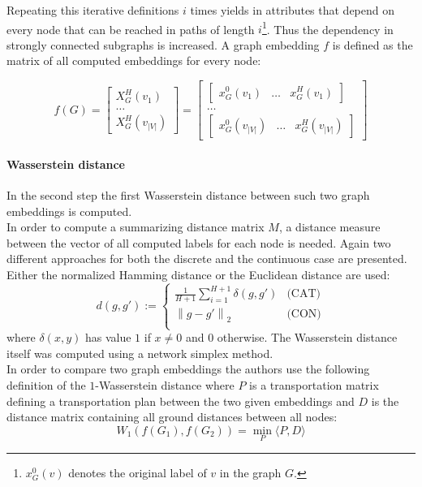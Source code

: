 \documentclass[twoside]{scrartcl}
\newcommand{\norm}[1]{\left\lVert#1\right\rVert}
\begin{document}
Repeating this iterative definitions $i$ times yields in attributes that depend on every node that can be reached in paths of length $i$\footnote{$x^{0}_G(v)$ denotes the original label of $v$ in the graph $G$.}. Thus the dependency in strongly connected subgraphs is increased. A graph embedding $f$ is defined as the matrix of all computed embeddings for every node:

\[ f(G) = \begin{bmatrix}
X^H_G(v_1) \\ \dots \\ X^H_G(v_{|V|})
\end{bmatrix} = \begin{bmatrix}
\begin{bmatrix}
x^{0}_G(v_1) & \dots & x^{H}_G(v_1)
\end{bmatrix} \\ \dots \\ \begin{bmatrix}
x^{0}_G(v_{|V|}) & \dots & x^{H}_G(v_{|V|})
\end{bmatrix}
\end{bmatrix} \]

\paragraph{Wasserstein distance}
In the second step the first Wasserstein distance between such two graph embeddings is computed.\\

In order to compute a summarizing distance matrix $M$, a distance measure between the vector of all computed labels for each node is needed. Again two different approaches for both the discrete and the continuous case are presented. Either the normalized Hamming distance or the Euclidean distance are used:
\[ d(g, g') := \begin{cases}
\frac{1}{H+1}\sum\limits_{i=1}^{H+1} \delta(g, g') & \text{(CAT)}\\ 
\norm{g-g'}_2  & \text{(CON)}\\ 
\end{cases} \]
where $\delta(x,y)$ has value $1$ if $x\neq 0$ and $0$ otherwise. The Wasserstein distance itself was computed using a network simplex method.\\ %

In order to compare two graph embeddings the authors use the following definition of the $1$-Wasserstein distance where $P$ is a transportation matrix defining a transportation plan between the two given embeddings and $D$ is the distance matrix containing all ground distances between all nodes:
\[ W_1(f(G_1),f(G_2))= \min\limits_{P}\langle P,D\rangle \]
\end{document}
